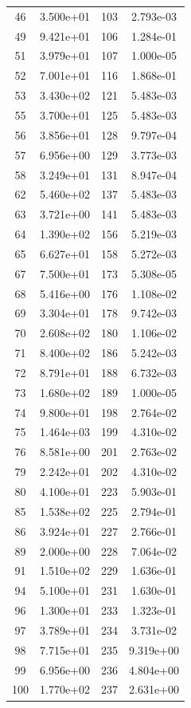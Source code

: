 \documentclass[12pt]{article}
\begin{document}
\begin{longtable}{@{}cccc@{}}
46 & 3.500e+01 & 103 & 2.793e-03 \\
49 & 9.421e+01 & 106 & 1.284e-01 \\
51 & 3.979e+01 & 107 & 1.000e-05 \\
52 & 7.001e+01 & 116 & 1.868e-01 \\
53 & 3.430e+02 & 121 & 5.483e-03 \\
55 & 3.700e+01 & 125 & 5.483e-03 \\
56 & 3.856e+01 & 128 & 9.797e-04 \\
57 & 6.956e+00 & 129 & 3.773e-03 \\
58 & 3.249e+01 & 131 & 8.947e-04 \\
62 & 5.460e+02 & 137 & 5.483e-03 \\
63 & 3.721e+00 & 141 & 5.483e-03 \\
64 & 1.390e+02 & 156 & 5.219e-03 \\
65 & 6.627e+01 & 158 & 5.272e-03 \\
67 & 7.500e+01 & 173 & 5.308e-05 \\
68 & 5.416e+00 & 176 & 1.108e-02 \\
69 & 3.304e+01 & 178 & 9.742e-03 \\
70 & 2.608e+02 & 180 & 1.106e-02 \\
71 & 8.400e+02 & 186 & 5.242e-03 \\
72 & 8.791e+01 & 188 & 6.732e-03 \\
73 & 1.680e+02 & 189 & 1.000e-05 \\
74 & 9.800e+01 & 198 & 2.764e-02 \\
75 & 1.464e+03 & 199 & 4.310e-02 \\
76 & 8.581e+00 & 201 & 2.763e-02 \\
79 & 2.242e+01 & 202 & 4.310e-02 \\
80 & 4.100e+01 & 223 & 5.903e-01 \\
85 & 1.538e+02 & 225 & 2.794e-01 \\
86 & 3.924e+01 & 227 & 2.766e-01 \\
89 & 2.000e+00 & 228 & 7.064e-02 \\
91 & 1.510e+02 & 229 & 1.636e-01 \\
94 & 5.100e+01 & 231 & 1.630e-01 \\
96 & 1.300e+01 & 233 & 1.323e-01 \\
97 & 3.789e+01 & 234 & 3.731e-02 \\
98 & 7.715e+01 & 235 & 9.319e+00 \\
99 & 6.956e+00 & 236 & 4.804e+00 \\
100 & 1.770e+02 & 237 & 2.631e+00 \\

\end{longtable}
\end{document}
